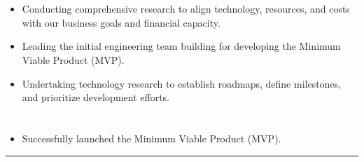 \documentclass[12pt]{res} %
\begin{document}
\begin{resume}
\begin{minipage}[t]{0.48\linewidth}
	\section{}
	\vspace{10pt}
	\begin{itemize}
		\item Conducting comprehensive research to align technology, resources, and costs with our business goals and financial capacity.
		\item Leading the initial engineering team building for developing the Minimum Viable Product (MVP).
		\item Undertaking technology research to establish roadmaps, define milestones, and prioritize development efforts.
	\end{itemize}
\end{minipage}%
\hfill
\begin{minipage}[t]{0.48\linewidth}
	\section{}
	\vspace{10pt}
	\begin{itemize}
		\item Successfully launched the Minimum Viable Product (MVP).
	\end{itemize}
\end{minipage}

\begin{center}
	\rule{0.5\textwidth}{.2pt}
\end{center}


\end{resume}
\end{document}
